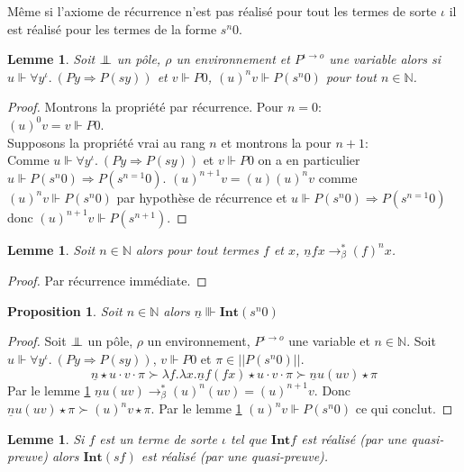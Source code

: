 \documentclass[a4paper,12pt]{article}
\newtheorem{prop}[theo]{Proposition}
\newtheorem{lem}[theo]{Lemme}
\theoremstyle{rmqstyle}
\newcommand{\N}{\mathbb{N}}
\newcommand{\abss}[1]{\lvert \lvert#1\rvert \rvert}
\renewcommand{\int}{\mathbf{Int}}
\renewcommand{\implies}{\Rightarrow}
\newcommand{\rbeta}{\longrightarrow_\beta}
\newcommand{\pole}{{\protect\mathpalette{\protect\polehelper}{\bot}}} \def\polehelper#1#2{\mathrel{\rlap{$#1#2$}\mkern3mu{#1#2}}}
\newcommand{\Kri}[1]{\underline{#1}}
\begin{document}
Même si l'axiome de récurrence n'est pas réalisé pour tout les termes de sorte $\iota$ il est réalisé pour les termes de la forme $s^n 0$. 

\begin{lem}
\label{lem recu}
Soit $\pole$ un pôle, $\rho$ un environnement et $P^{\iota \to o}$ une variable alors si $u \Vdash \forall y^\iota. \ (Py \implies P(sy))$ et $v \Vdash P0$, $(u)^n v \Vdash P(s^n 0)$ pour tout $n \in \N$.
\end{lem}

\begin{proof}
Montrons la propriété par récurrence. Pour $n = 0$:\\
$(u)^0 v = v \Vdash P0$.\\
Supposons la propriété vrai au rang $n$ et montrons la pour $n+1$:\\
Comme $u \Vdash \forall y^\iota. \ (Py \implies P(sy))$ et $v \Vdash P0$ on a en particulier $u \Vdash P(s^n 0) \implies P(s^{n =1} 0)$. $(u)^{n+1} v = (u) (u)^n v$ comme $(u)^n v \Vdash P(s^n 0)$ par hypothèse de récurrence et $u \Vdash P(s^n 0) \implies P(s^{n =1} 0)$ donc $(u)^{n+1} v \Vdash P(s^{n+1})$. 
\end{proof}

\begin{lem}
\label{lem kri}
Soit $n \in \N$ alors pour tout termes $f$ et $x$, $\Kri{n} f x \rbeta^* (f)^n x$.
\end{lem}

\begin{proof}
Par récurrence immédiate.
\end{proof}

\begin{prop}
Soit $n \in \N$ alors $\Kri{n} \Vvdash \int(s^n 0)$
\end{prop}

\begin{proof}
Soit $\pole$ un pôle, $\rho$ un environnement, $P^{\iota \to o}$ une variable et $n \in \N$. Soit $u \Vdash \forall y^\iota. \ (Py \implies P(sy))$, $v \Vdash P0$ et $\pi \in \abss{P(s^{n} 0)}$.  
$$\Kri{n} \star u \cdot v \cdot \pi \succ \lambda f. \lambda x. \Kri{n} f (f x) \star u \cdot v \cdot \pi \succ  \Kri{n} u (u v) \star \pi$$
Par le lemme \ref{lem kri} $\Kri{n} u (u v) \rbeta^* (u)^n (u v) = (u)^{n+1} v$. Donc $\Kri{n} u (u v) \star \pi \succ (u)^n v \star \pi$. Par le lemme \ref{lem recu} $(u)^n v \Vdash P(s^n 0)$ ce qui conclut.
\end{proof}

\begin{lem}
\label{lem suc}
Si $f$ est un terme de sorte $\iota$ tel que $\int{f}$ est réalisé (par une quasi-preuve) alors $\int(sf)$ est réalisé (par une quasi-preuve).
\end{lem}
\end{document}
